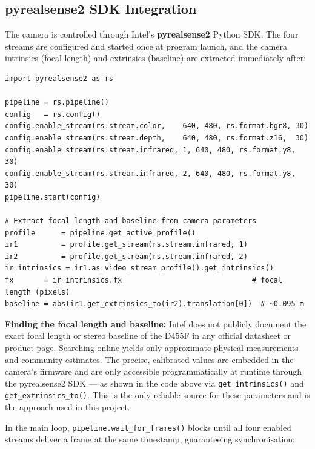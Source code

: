 \documentclass[12pt, a4paper]{article}
\newcommand{\code}[1]{\texttt{\small#1}}
\begin{document}
\subsection{pyrealsense2 SDK Integration}

The camera is controlled through Intel's \textbf{pyrealsense2} Python SDK. The
four streams are configured and started once at program launch, and the camera
intrinsics (focal length) and extrinsics (baseline) are extracted immediately
after:

\begin{lstlisting}[caption={Camera setup and intrinsics extraction (live\_stream.py lines 1--26)}]
import pyrealsense2 as rs

pipeline = rs.pipeline()
config   = rs.config()
config.enable_stream(rs.stream.color,    640, 480, rs.format.bgr8, 30)
config.enable_stream(rs.stream.depth,    640, 480, rs.format.z16,  30)
config.enable_stream(rs.stream.infrared, 1, 640, 480, rs.format.y8, 30)
config.enable_stream(rs.stream.infrared, 2, 640, 480, rs.format.y8, 30)
pipeline.start(config)

# Extract focal length and baseline from camera parameters
profile      = pipeline.get_active_profile()
ir1          = profile.get_stream(rs.stream.infrared, 1)
ir2          = profile.get_stream(rs.stream.infrared, 2)
ir_intrinsics = ir1.as_video_stream_profile().get_intrinsics()
fx       = ir_intrinsics.fx                              # focal length (pixels)
baseline = abs(ir1.get_extrinsics_to(ir2).translation[0])  # ~0.095 m
\end{lstlisting}

\begin{notebox}
\textbf{Finding the focal length and baseline:} Intel does not publicly
document the exact focal length or stereo baseline of the D455F in any
official datasheet or product page. Searching online yields only approximate
physical measurements and community estimates. The precise, calibrated values
are embedded in the camera's firmware and are only accessible programmatically
at runtime through the pyrealsense2 SDK --- as shown in the code above via
\code{get\_intrinsics()} and \code{get\_extrinsics\_to()}. This is the only
reliable source for these parameters and is the approach used in this project.
\end{notebox}

In the main loop, \code{pipeline.wait\_for\_frames()} blocks until all four
enabled streams deliver a frame at the same timestamp, guaranteeing
synchronisation:
\end{document}
